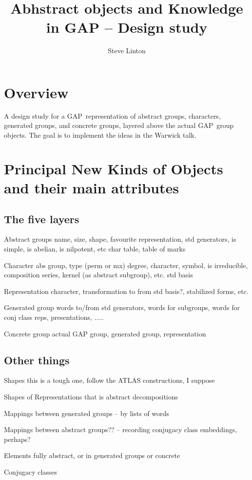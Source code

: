 \documentclass{article}
\title{Abhstract objects and Knowledge in GAP -- Design study}
\author{Steve Linton}
\def\GAP{\textsf{GAP}}
\begin{document}
\maketitle

\section{Overview}

A design study for a \GAP\ representation of abstract groups,
characters, generated groups, and concrete groups, layered above the
actual \GAP\ group objects. The goal is to implement the ideas in the
Warwick talk.

\section{Principal New Kinds of Objects and  their main attributes}

\subsection{The five layers}

\begin{description}
\item{Abstract groups} name, size, shape, favourite representation, std
generators, is simple, is abelian, is nilpotent, etc char table, table 
of marks

\item{Character} abs group, type (perm or mx) degree, character, symbol, 
is irreducible, composition series, kernel (as abstract subgroup), etc. std basis

\item{Representation} character, transformation to from std basis?,
stabilized forms, etc.

\item{Generated group} words to/from std generators, words for subgroups,
words for conj class reps, presentations, .....

\item{Concrete group} actual GAP group, generated group, representation

\end{description}

\subsection{Other things}
\begin{description}
\item{Shapes} this is a tough one, follow the ATLAS constructions, I
suppose
\item{Shapes of Representations} that is abstract decompositions
\item{Mappings} between generated groups -- by lists of words
\item{Mappings} between abstract groups?? -- recording conjugacy class
embeddings, perhaps?
\item{Elements} fully abstract, or in generated groups or concrete
\item{Conjugacy classes}
\end{description}
\end{document}
